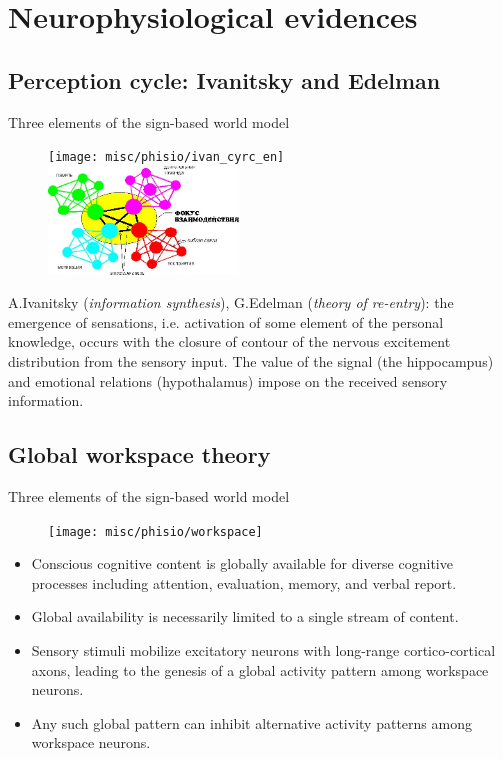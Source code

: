 \documentclass[default]{beamer}
\begin{document}
	\section{Neurophysiological evidences}
	\subsection{Perception cycle: Ivanitsky and Edelman}
	\begin{frame}{Three elements of the sign-based world model}
		\begin{figure}
			\texttt{[image: misc/phisio/ivan\_cyrc\_en]}
			\quad
			\includegraphics[width=0.45\textwidth]{misc/phisio/focus_inter.jpg}
		\end{figure}
		\small
		A.Ivanitsky (\textit{information synthesis}), G.Edelman (\textit{theory of re-entry}):  the emergence of sensations, i.e. activation of some element of the personal knowledge, occurs with the closure of contour of the nervous excitement distribution from the sensory input. The value of the signal (the hippocampus) and emotional relations (hypothalamus) impose on the received sensory information.
		
		\nocite{*}
		\printbibliography[keyword={ivan}, resetnumbers=true]
	\end{frame}

	\subsection{Global workspace theory}
	\begin{frame}{Three elements of the sign-based world model}
		\begin{figure}
			\texttt{[image: misc/phisio/workspace]}
		\end{figure}
		
		\scriptsize
		\begin{itemize}
			\item Conscious cognitive content is globally available for diverse cognitive processes including attention, evaluation, memory, and verbal report.
			\item Global availability is necessarily limited to a single stream of content.
			\item Sensory stimuli mobilize excitatory neurons with long-range cortico-cortical axons, leading to the genesis of a global activity pattern among workspace neurons.
			\item Any such global pattern can inhibit alternative activity patterns among workspace neurons.
		\end{itemize}
		\vspace{-5pt}
		\nocite{*}
		\printbibliography[keyword={baars}, resetnumbers=true]
	\end{frame}
\end{document}
